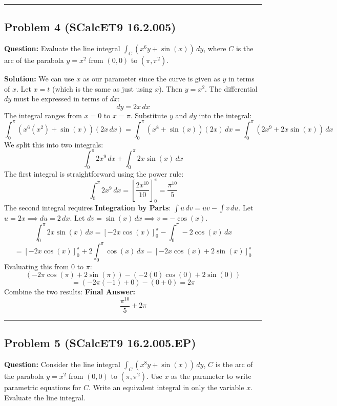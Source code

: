 \documentclass{article}
\begin{document}
\hrule \vspace{0.5cm}

\subsection{Problem 4 (SCalcET9 16.2.005)}
\textbf{Question:} Evaluate the line integral $\int_C (x^6y + \sin(x)) \, dy$, where $C$ is the arc of the parabola $y = x^2$ from $(0, 0)$ to $(\pi, \pi^2)$.

\textbf{Solution:}
We can use $x$ as our parameter since the curve is given as $y$ in terms of $x$.
Let $x = t$ (which is the same as just using $x$). Then $y = x^2$.
The differential $dy$ must be expressed in terms of $dx$:
\[ dy = 2x \, dx \]
The integral ranges from $x = 0$ to $x = \pi$. Substitute $y$ and $dy$ into the integral:
\[ \int_0^\pi (x^6(x^2) + \sin(x)) (2x \, dx) = \int_0^\pi (x^8 + \sin(x))(2x) \, dx = \int_0^\pi (2x^9 + 2x\sin(x)) \, dx \]
We split this into two integrals:
\[ \int_0^\pi 2x^9 \, dx + \int_0^\pi 2x\sin(x) \, dx \]
The first integral is straightforward using the power rule:
\[ \int_0^\pi 2x^9 \, dx = \left[ \frac{2x^{10}}{10} \right]_0^\pi = \frac{\pi^{10}}{5} \]
The second integral requires \textbf{Integration by Parts}: $\int u \, dv = uv - \int v \, du$.
Let $u = 2x \implies du = 2 \, dx$.
Let $dv = \sin(x) \, dx \implies v = -\cos(x)$.
\[ \int_0^\pi 2x\sin(x) \, dx = \left[ -2x\cos(x) \right]_0^\pi - \int_0^\pi -2\cos(x) \, dx \]
\[ = \left[ -2x\cos(x) \right]_0^\pi + 2\int_0^\pi \cos(x) \, dx = \left[ -2x\cos(x) + 2\sin(x) \right]_0^\pi \]
Evaluating this from $0$ to $\pi$:
\[ (-2\pi\cos(\pi) + 2\sin(\pi)) - (-2(0)\cos(0) + 2\sin(0)) \]
\[ = (-2\pi(-1) + 0) - (0 + 0) = 2\pi \]
Combine the two results:
\textbf{Final Answer:} 
\[ \frac{\pi^{10}}{5} + 2\pi \]

\hrule \vspace{0.5cm}

\subsection{Problem 5 (SCalcET9 16.2.005.EP)}
\textbf{Question:} Consider the line integral $\int_C (x^8y + \sin(x)) \, dy$, $C$ is the arc of the parabola $y = x^2$ from $(0,0)$ to $(\pi, \pi^2)$. Use $x$ as the parameter to write parametric equations for $C$. Write an equivalent integral in only the variable $x$. Evaluate the line integral.
\end{document}
